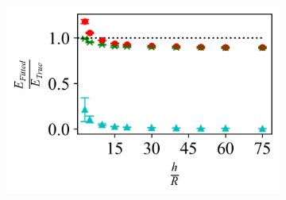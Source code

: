 \begin{figure}[H]
\begin{subfigure}[t]{0.32\textwidth}
        \includegraphics[width=1\linewidth]{Figures/Capped-Plane-Youngs_Modulus.png}
    \end{subfigure}

    
    \hfill
    \vspace{-0.4in}
    

\end{figure}

